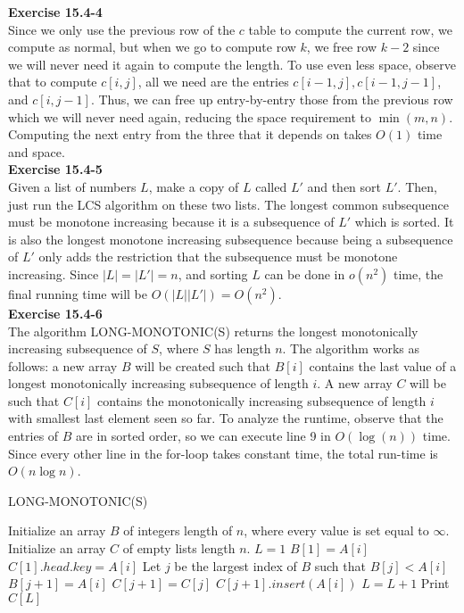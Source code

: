 \documentclass{article}
\begin{document}
\noindent\textbf{Exercise 15.4-4}\\

Since we only use the previous row of the $c$ table to compute the current row, we compute as normal, but when we go to compute row $k$, we free row $k-2$ since we will never need it again to compute the length.  To use even less space, observe that to compute $c[i,j]$, all we need are the entries $c[i-1,j], c[i-1,j-1]$, and $c[i,j-1]$.  Thus, we can free up entry-by-entry those from the previous row which we will never need again, reducing the space requirement to $\min(m,n)$.  Computing the next entry from the three that it depends on takes $O(1)$ time and space.\\


\noindent\textbf{Exercise 15.4-5}\\

Given a list of numbers $L$, make a copy of $L$ called $L'$ and then sort $L'$. Then, just run the LCS algorithm on these two lists. The longest common subsequence must be monotone increasing because it is a subsequence of $L'$ which is sorted. It is also the longest monotone increasing subsequence because being a subsequence of $L'$ only adds the restriction that the subsequence must be monotone increasing. Since $|L|=|L'| =n$, and sorting $L$ can be done in $o(n^2)$ time, the final running time will be $O(|L||L'|) = O(n^2)$.\\

\noindent\textbf{Exercise 15.4-6}\\

The algorithm LONG-MONOTONIC(S) returns the longest monotonically increasing subsequence of $S$, where $S$ has length $n$.  The algorithm works as follows: a new array $B$ will be created such that $B[i]$ contains the last value of a longest monotonically increasing subsequence of length $i$.  A new array $C$ will be such that $C[i]$ contains the monotonically increasing subsequence of length $i$ with smallest last element seen so far. To analyze the runtime, observe that the entries of $B$ are in sorted order, so we can execute line 9 in $O(\log(n))$ time.  Since every other line in the for-loop takes constant time, the total run-time is $O(n\log n)$.


\begin{algorithm}
\caption{LONG-MONOTONIC(S)}
\begin{algorithmic}[1]
\State Initialize an array $B$ of integers length of $n$, where every value is set equal to $\infty$.
\State Initialize an array $C$ of empty lists length $n$.
\State $L=1$
		\State $B[1] = A[i]$
		\State $C[1].head.key = A[i]$
	\Else
		\State Let $j$ be the largest index of $B$ such that $B[j] < A[i]$
		\State $B[j+1] = A[i]$
		\State $C[j+1] = C[j]$
		\State $C[j+1].insert(A[i])$
			\State $L = L + 1$
		\EndIf
	\EndIf
\EndFor
\State Print $C[L]$
\end{algorithmic}
\end{algorithm}
\end{document}
